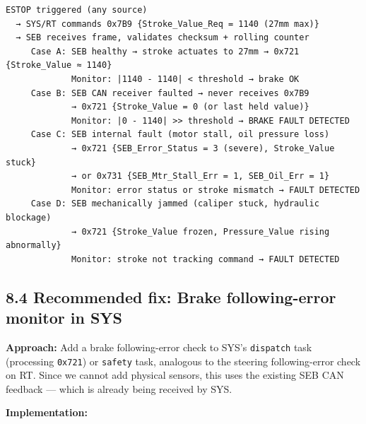 \documentclass[12pt,a4paper,oneside]{report}
\begin{document}
\begin{verbatim}
ESTOP triggered (any source)
  → SYS/RT commands 0x7B9 {Stroke_Value_Req = 1140 (27mm max)}
  → SEB receives frame, validates checksum + rolling counter
     Case A: SEB healthy → stroke actuates to 27mm → 0x721 {Stroke_Value ≈ 1140}
             Monitor: |1140 - 1140| < threshold → brake OK
     Case B: SEB CAN receiver faulted → never receives 0x7B9
             → 0x721 {Stroke_Value = 0 (or last held value)}
             Monitor: |0 - 1140| >> threshold → BRAKE FAULT DETECTED
     Case C: SEB internal fault (motor stall, oil pressure loss)
             → 0x721 {SEB_Error_Status = 3 (severe), Stroke_Value stuck}
             → or 0x731 {SEB_Mtr_Stall_Err = 1, SEB_Oil_Err = 1}
             Monitor: error status or stroke mismatch → FAULT DETECTED
     Case D: SEB mechanically jammed (caliper stuck, hydraulic blockage)
             → 0x721 {Stroke_Value frozen, Pressure_Value rising abnormally}
             Monitor: stroke not tracking command → FAULT DETECTED
\end{verbatim}

\subsection{8.4 Recommended fix: Brake following-error monitor in
SYS}\label{recommended-fix-brake-following-error-monitor-in-sys}

\textbf{Approach:} Add a brake following-error check to SYS's \texttt{dispatch}
task (processing \texttt{0x721}) or \texttt{safety} task, analogous to the
steering following-error check on RT. Since we cannot add physical sensors, this
uses the existing SEB CAN feedback --- which is already being received by SYS.

\textbf{Implementation:}
\end{document}
